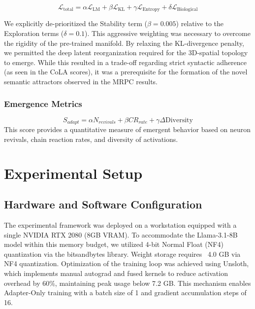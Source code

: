 \documentclass[11pt, letterpaper]{article}
\begin{document}
\begin{equation}
    \label{eq:combined_loss}
    \mathcal{L}_{\text{total}} = \alpha \mathcal{L}_{\text{LM}} + \beta \mathcal{L}_{\text{KL}} + \gamma \mathcal{L}_{\text{Entropy}} + \delta \mathcal{L}_{\text{Biological}}
\end{equation}

We explicitly de-prioritized the Stability term ($\beta=0.005$) relative to the Exploration terms ($\delta=0.1$). This aggressive weighting was necessary to overcome the rigidity of the pre-trained manifold. By relaxing the KL-divergence penalty, we permitted the deep latent reorganization required for the 3D-spatial topology to emerge. While this resulted in a trade-off regarding strict syntactic adherence (as seen in the CoLA scores), it was a prerequisite for the formation of the novel semantic attractors observed in the MRPC results.

\subsubsection{Emergence Metrics}
\begin{equation}
    S_{adapt} = \alpha N_{revivals} + \beta CR_{rate} + \gamma \Delta \text{Diversity}
\end{equation}
This score provides a quantitative measure of emergent behavior based on neuron revivals, chain reaction rates, and diversity of activations.

\section{Experimental Setup}
\subsection{Hardware and Software Configuration}

The experimental framework was deployed on a workstation equipped with a single NVIDIA RTX 2080 (8GB VRAM). To accommodate the Llama-3.1-8B model within this memory budget, we utilized 4-bit Normal Float (NF4) quantization via the bitsandbytes library. Weight storage requires ~4.0 GB via NF4 quantization. Optimization of the training loop was achieved using Unsloth, which implements manual autograd and fused kernels to reduce activation overhead by 60\%, maintaining peak usage below 7.2 GB. This mechanism enables Adapter-Only training with a batch size of 1 and gradient accumulation steps of 16.
\end{document}
